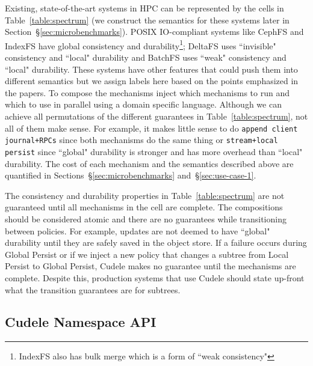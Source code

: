 Existing, state-of-the-art systems in HPC can be represented by the cells in
Table~\ref{table:spectrum} (we construct the semantics for these systems later
in Section~\S\ref{sec:microbenchmarks}).  POSIX IO-compliant systems like
CephFS and IndexFS have global consistency and durability\footnote{ IndexFS
also has bulk merge which is a form of ``weak consistency"}; DeltaFS uses
``invisible" consistency and ``local" durability and BatchFS uses ``weak"
consistency and ``local" durability. These systems have other features that
could push them into different semantics but we assign labels here based on the
points emphasized in the papers.  To compose the mechanisms
 inject which mechanisms to run
and which to use in parallel using a domain specific language.  Although we can
achieve all permutations of the different guarantees in
Table~\ref{table:spectrum}, not all of them make sense. For example, it makes
little sense to do \texttt{append client journal+RPCs} since both mechanisms do
the same thing or \texttt{stream+local persist} since ``global" durability is
stronger and has more overhead than ``local" durability. The cost of each
mechanism and the semantics described above are quantified in
Sections~\S\ref{sec:microbenchmarks} and~\S\ref{sec:use-case-1}.

The consistency and durability properties in Table~\ref{table:spectrum} are not
guaranteed until all mechanisms in the cell are complete. The compositions
should be considered atomic and there are no guarantees while transitioning
between policies. For example, updates are not deemed to have ``global"
durability until they are safely saved in the object store. If a failure occurs
during Global Persist or if we inject a new policy that changes a subtree from
Local Persist to Global Persist, Cudele makes no guarantee until the mechanisms
are complete. Despite this, production systems that use Cudele should state
up-front what the transition guarantees are for subtrees.

\subsection{Cudele Namespace API}
\label{sec:cudelefs-namespace-api}

